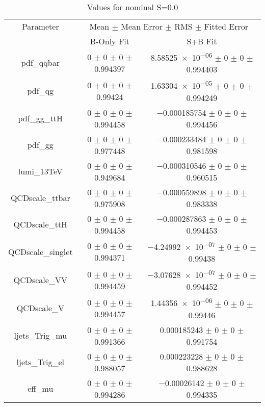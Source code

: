 \begin{table}
\centering
\caption{Values for nominal S=0.0}
\begin{tabular}{ccc}
\toprule
Parameter 	& \multicolumn{2}{c}{Mean $\pm$ Mean Error $\pm$ RMS $\pm$ Fitted Error}\\
 	& B-Only Fit & S+B Fit\\
\midrule
pdf\_qqbar 	& \num{0} $\pm$ \num{0} $\pm$ \num{0} $\pm$ \num{0.994397} 	& \num{8.58525e-06} $\pm$ \num{0} $\pm$ \num{0} $\pm$ \num{0.994403}\\
pdf\_qg 	& \num{0} $\pm$ \num{0} $\pm$ \num{0} $\pm$ \num{0.99424} 	& \num{1.63304e-05} $\pm$ \num{0} $\pm$ \num{0} $\pm$ \num{0.994249}\\
pdf\_gg\_ttH 	& \num{0} $\pm$ \num{0} $\pm$ \num{0} $\pm$ \num{0.994458} 	& \num{-0.000185754} $\pm$ \num{0} $\pm$ \num{0} $\pm$ \num{0.994456}\\
pdf\_gg 	& \num{0} $\pm$ \num{0} $\pm$ \num{0} $\pm$ \num{0.977448} 	& \num{-0.000233484} $\pm$ \num{0} $\pm$ \num{0} $\pm$ \num{0.981598}\\
lumi\_13TeV 	& \num{0} $\pm$ \num{0} $\pm$ \num{0} $\pm$ \num{0.949684} 	& \num{-0.000310546} $\pm$ \num{0} $\pm$ \num{0} $\pm$ \num{0.960515}\\
QCDscale\_ttbar 	& \num{0} $\pm$ \num{0} $\pm$ \num{0} $\pm$ \num{0.975908} 	& \num{-0.000559898} $\pm$ \num{0} $\pm$ \num{0} $\pm$ \num{0.983338}\\
QCDscale\_ttH 	& \num{0} $\pm$ \num{0} $\pm$ \num{0} $\pm$ \num{0.994458} 	& \num{-0.000287863} $\pm$ \num{0} $\pm$ \num{0} $\pm$ \num{0.994453}\\
QCDscale\_singlet 	& \num{0} $\pm$ \num{0} $\pm$ \num{0} $\pm$ \num{0.994371} 	& \num{-4.24992e-07} $\pm$ \num{0} $\pm$ \num{0} $\pm$ \num{0.99438}\\
QCDscale\_VV 	& \num{0} $\pm$ \num{0} $\pm$ \num{0} $\pm$ \num{0.994459} 	& \num{-3.07628e-07} $\pm$ \num{0} $\pm$ \num{0} $\pm$ \num{0.994452}\\
QCDscale\_V 	& \num{0} $\pm$ \num{0} $\pm$ \num{0} $\pm$ \num{0.994457} 	& \num{1.44356e-06} $\pm$ \num{0} $\pm$ \num{0} $\pm$ \num{0.99446}\\
ljets\_Trig\_mu 	& \num{0} $\pm$ \num{0} $\pm$ \num{0} $\pm$ \num{0.991366} 	& \num{0.000185243} $\pm$ \num{0} $\pm$ \num{0} $\pm$ \num{0.991754}\\
ljets\_Trig\_el 	& \num{0} $\pm$ \num{0} $\pm$ \num{0} $\pm$ \num{0.988057} 	& \num{0.000223228} $\pm$ \num{0} $\pm$ \num{0} $\pm$ \num{0.988628}\\
eff\_mu 	& \num{0} $\pm$ \num{0} $\pm$ \num{0} $\pm$ \num{0.994286} 	& \num{-0.00026142} $\pm$ \num{0} $\pm$ \num{0} $\pm$ \num{0.994335}\\

\end{tabular}
\end{table}
